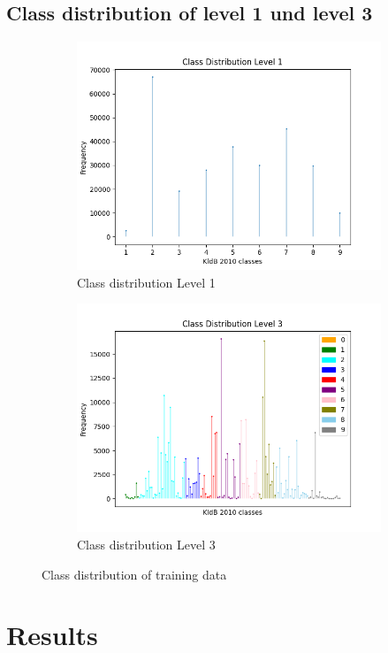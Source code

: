 \documentclass[12pt, a4paper, titlepage]{article}
\begin{document}
\subsection{Class distribution of level 1 und level 3}
\begin{figure}[hb!]
  \begin{subfigure}{.5\textwidth}
    \centering
    \includegraphics[width=.9\linewidth]{training_data_long_L1.png}
    \caption{\label{fig: F11} Class distribution Level 1}
  \end{subfigure}%
  \begin{subfigure}{.5\textwidth}
    \centering
    \includegraphics[width=.9\linewidth]{training_data_long_L3.png}
    \caption{\label{fig: F12} Class distribution Level 3}
  \end{subfigure}
  \caption{Class distribution of training data}
  \end{figure}


\section{Results}
\end{document}
